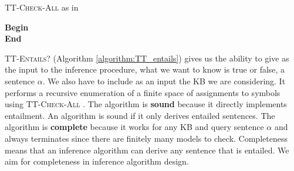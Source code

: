 \vspace{0.6cm}
\begin{algorithm}[H]
\label{algorithm:tt_check_all}
\caption{\textsc{TT-Check-All} as in \citep{russell2016artificial}}
\SetAlgoLined
\DontPrintSemicolon
{}
\textbf{Begin} \\
\Indm 
\textbf{End} 
\end{algorithm}
\vspace{0.5cm}

\textsc{TT-Entails?} (Algorithm \ref{algorithm:TT_entails}) gives us the ability to give as the input to the inference procedure, what we want to know is true or false, a sentence $\alpha$. We also have to include as an input the KB we are considering. It performs a recursive enumeration of a finite space of assignments to symbols using \textsc{TT-Check-All} \citep{russell2016artificial}. 
The algorithm is \textbf{sound} because it directly implements entailment. An algorithm is sound if it only derives entailed sentences. The algorithm is \textbf{complete} because it works for any KB and query sentence $\alpha$ and always terminates since there are finitely many models to check. Completeness means that an inference algorithm can derive any sentence that is entailed. We aim for completeness in inference algorithm design.

